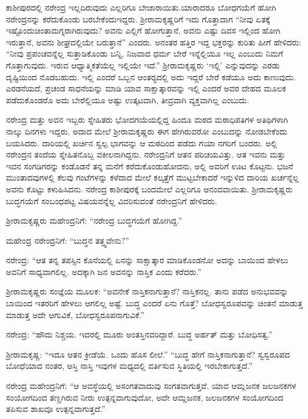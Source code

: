 ಕಾಶೀಪುರದಲ್ಲಿ ನರೇಂದ್ರ ಇಲ್ಲದಿರುವುದು ಎಲ್ಲರಿಗೂ ಬೇಜಾರಾಯಿತು.\break ಯಾರಾದರೂ ಬೋಧಗಯೆಗೆ ಹೋಗಿ ನರೇಂದ್ರನನ್ನು ಕರೆದುಕೊಂಡು ಬರಬೇಕೆಂದು\break ಇದ್ದರು. ಶ‍್ರೀರಾಮಕೃಷ್ಣರಿಗೆ ಇದು ಗೊತ್ತಾದಾಗ “ನೀವು ಏತಕ್ಕೆ ಇಷ್ಟೊಂದು\break ಚಿಂತಾಮಗ್ನರಾಗಿರುವುದು? ಅವನು ಎಲ್ಲಿಗೆ ಹೋಗುತ್ತಾನೆ, ಅವನು ಎಷ್ಟು ದಿವಸ ಇಲ್ಲಿಂದ ಹೋಗಿ ಇರುತ್ತಾನೆ, ಅವನು ಶೀಘ್ರದಲ್ಲಿಯೇ ಬರುತ್ತಾನೆ” ಎಂದರು. ಅನಂತರ ಹತ್ತಿರ ಇದ್ದ ಭಕ್ತರನ್ನು ಕುರಿತು ಹೀಗೆ ಹೇಳಿದರು: “ನೀವು ಪ್ರಪಂಚವನ್ನೆಲ್ಲ ಸುತ್ತಾಡಿಕೊಂಡು ಬನ್ನಿ, ನಿಜವಾದ ಧರ್ಮ ಬೇರೆ ಇನ್ನೆಲ್ಲಿಯೂ ಇಲ್ಲ ಎಂಬುದು ನಿಮಗೆ ಗೊತ್ತಾಗುವುದು. ಇರುವ ಆಧ್ಯಾತ್ಮಿಕತೆಯೆಲ್ಲ ಇಲ್ಲಿಯೇ ಇದೆ.” ಶ‍್ರೀರಾಮಕೃಷ್ಣರು ‘ಇಲ್ಲಿ’ ಎನ್ನುವುದನ್ನು ಎರಡು ದೃಷ್ಟಿಯಿಂದ ನೊಡಬಹುದು. ಇಲ್ಲಿ ಎಂದರೆ ಒಬ್ಬನ ಆಂತರ‍್ಯದಲ್ಲಿ ಅದು ಇದ್ದರೆ ಬೇರೆ ಕಡೆಯೂ ಅದು ಕಾಣುವುದು. ಎರಡನೆಯದೆ, ಪ್ರಚಂಡ ಸಾಧನೆಯನ್ನು ಮಾಡಿ ಯಾವ ಸಾಕ್ಷಾತ್ಕಾರವನ್ನು ಇಲ್ಲಿ ಎಂದರೆ ಅವರ ದೇಹದ ಮೂಲಕ ಪಡೆದುಕೊಂಡರೊ ಅದು ಬೇರೆಲ್ಲಿಯೂ ಅಷ್ಟು ಉತ್ಕಟವಾಗಿ, ತೀವ್ರವಾಗಿ ವ್ಯಕ್ತವಾಗಿಲ್ಲ ಎಂಬುದು.

ನರೇಂದ್ರ ಮತ್ತು ಅವನ ಇಬ್ಬರು ಸ್ನೇಹಿತರು ಭೋದಗಯೆಯಲ್ಲಿದ್ದ ಹಿಂದೂ ಮಠದ ಮಠಾಧಿಪತಿಗಳ ಅತಿಥಿಗಳಾಗಿ ನಾಲ್ಕು ದಿನಗಳು ಇದ್ದರು. ಅದಾದ ಮೇಲೆ ಶ‍್ರೀರಾಮಕೃಷ್ಣರು ಈಗ ಹೇಗಿರುವರೋ ಎಂಬುದನ್ನು ನೋಡಬೇಕೆಂದು ಬಯಸಿದರು. ದಾರಿಯಲ್ಲಿ ಖರ್ಚಿನ ಸ್ವಲ್ಪ ಭಾಗವನ್ನು ಆ ಮಠದಿಂದ ಪಡೆದು ಗಯಾ ನಗರಿಗೆ ಬಂದರು. ಅಲ್ಲಿ ನರೇಂದ್ರನ ತಂದೆಯ ಸ್ನೇಹಿತನೊಬ್ಬ ವಕೀಲನಾಗಿದ್ದನು. ನರೇಂದ್ರನಿಗೆ ಆತನ ಪರಿಚಯವಿತ್ತು. ಆತ ಇವನು ಮತ್ತು ಇವನ ಸಂಗಡಿಗರನ್ನು ಕಂಡೊಡನೆ ತನ್ನ ಮನೆಗೆ ಕರೆದುಕೊಂಡುಹೋದನು, ಅಲ್ಲಿ ಅವರಿಗೆ ಊಟ ಕೊಟ್ಟನು. ಭಜನೆ ಮುಂತಾದವುಗಳಲ್ಲಿ ಕೆಲವು ಗಂಟೆಗಳನ್ನು ಕಳೆದಾದ ಮೇಲೆ ಕಲ್ಕತ್ತೆಗೆ ಮುಟ್ಟಬೇಕಾದರೆ ಇನ್ನುಳಿದ ದಾರಿಯ ಖರ್ಚನ್ನೆಲ್ಲ ಅವನು ಕೊಟ್ಟು ಕಳುಹಿಸಿದನು. ನರೇಂದ್ರ ಕಾಶೀಪುರಕ್ಕೆ ಬಂದಮೇಲೆ ಎಲ್ಲರಿಗೂ ಆನಂದವಾಯಿತು. ಶ‍್ರೀರಾಮಕೃಷ್ಣರು ಬುದ್ಧಗಯೆಗೆ ಸಂಬಂಧಪಟ್ಟ ವಿಷಯವನ್ನೆಲ್ಲ ವಿವರಿಸುವಂತೆ ನರೇಂದ್ರನಿಗೆ ಹೇಳಿದರು.

ಶ‍್ರೀರಾಮಕೃಷ್ಣರು ಮಹೇಂದ್ರನಿಗೆ: “ನರೇಂದ್ರ ಬುದ್ಧಗಯೆಗೆ ಹೋಗಿದ್ದ.”

ಮಹೇಂದ್ರ ನರೇಂದ್ರನಿಗೆ: “ಬುದ್ಧನ ತತ್ತ್ವವೇನು?”

ನರೇಂದ್ರ: “ಆತ ತನ್ನ ತಪಸ್ಸಿನ ಕೊನೆಯಲ್ಲಿ ಏನನ್ನು ಸಾಕ್ಷಾತ್ಕಾರ ಮಾಡಿಕೊಂಡನೋ ಅದನ್ನು ಬಾಯಿಂದ ಹೇಳಲು ಅವನಿಗೆ ಸಾಧ್ಯವಾಗಲಿಲ್ಲ. ಅದಕ್ಕಾಗಿ ಜನ ಅವನನ್ನು ನಾಸ್ತಿಕ ಎಂದು ಕರೆದರು.”

ಶ‍್ರೀರಾಮಕೃಷ್ಣರು ಸಂಜ್ಞೆಯ ಮೂಲಕ: “ಅವನೇಕೆ ನಾಸ್ತಿಕನಾಗುತ್ತಾನೆ? ನಾಸ್ತಿಕನಲ್ಲ. ತಾನು ಪಡೆದ ಅನುಭವವನ್ನು ಬಾಯಿಂದ ಇತರರಿಗೆ ಹೇಳಲು ಆಗಲಿಲ್ಲ ಅಷ್ಟೆ. ಬುದ್ಧ ಎಂದರೆ ಏನು ಗೊತ್ತೆ? ಬೋಧಸ್ವರೂಪವನ್ನು ಚಿಂತನೆ ಮಾಡುತ್ತ ಮಾಡುತ್ತ ಅದೇ ಆಗುವಿಕೆ, ಬೋಧಸ್ವರೂಪನಾಗುವಿಕೆ.”

ನರೇಂದ್ರ: “ಹೌದು ನಿಶ್ಚಯ. ಇದರಲ್ಲಿ ಮೂರು ಅಂತಸ್ತಿನವರಿದ್ದಾರೆ. ಬುದ್ಧ ಅರ್ಹತ್ ಮತ್ತು ಬೋಧಿಸತ್ವ.”

ಶ‍್ರೀರಾಮಕೃಷ್ಣ: “ಇದೂ ಆತನ ಕ್ರೀಡೆಯೆ. ಒಂದು ಹೊಸ ಲೀಲೆ.” “ಬುದ್ಧ ಹೇಗೆ ನಾಸ್ತಿಕನಾಗುತ್ತಾನೆ? ಸ್ವಸ್ವರೂಪದ ಬೋಧೆಯಾದ ನಂತರ, ಅಸ್ತಿ ನಾಸ್ತಿ ಇವುಗಳ ಮಧ್ಯದಲ್ಲಿ ವರ್ತಿಸುವ ಸ್ಥಿತಿಯಲ್ಲಿ ಇರಬೇಕಾಗುತ್ತದೆ.”

ನರೇಂದ್ರ ಮಹೇಂದ್ರನಿಗೆ: “ಆ ಅವಸ್ಥೆಯಲ್ಲಿ ಅಸಂಗತವಾದುವು ಸಂಗತವಾಗುತ್ತವೆ. ಯಾವ ಆಮ್ಲಜನಕ ಜಲಜನಕಗಳ ಸಂಯೋಗದಿಂದ ತಣ್ಣಗಿರುವ ನೀರು ಉತ್ಪನ್ನವಾಗುವುದೋ, ಅದೇ ಆಮ್ಲಜನಕ, ಜಲಜನಕಗಳ ಸಂಯೋಗದಿಂದ ತಪಿಸುವ ಶಾಖವೂ ಉತ್ಪನ್ನವಾಗುತ್ತದೆ.”


